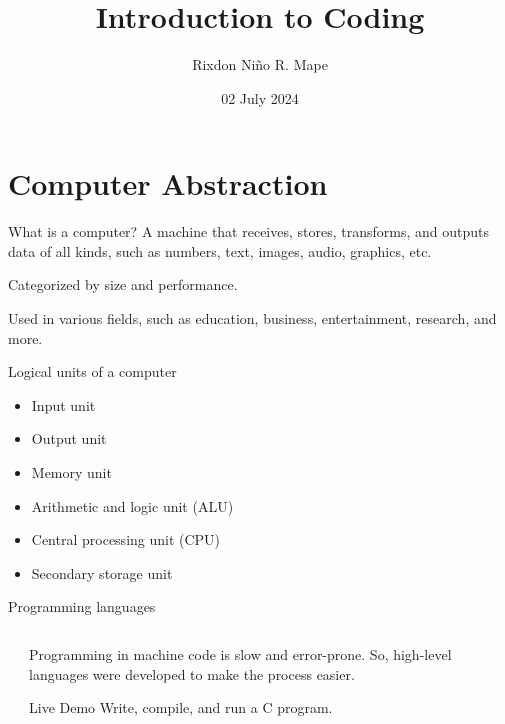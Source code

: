 \documentclass[sectionframe]{oxblue-beamer}
\title{Introduction to Coding}
\author[Mape, R. N. R.]{Rixdon Niño R. Mape}
\institute{
    College of Science \\
    Computer Science and Information Technology Department \\
    Bicol University
}
\date{02 July 2024}
\begin{document}
\begin{frame}
\titlepage
\end{frame}

\section{Computer Abstraction}

\begin{frame}{What is a computer?}
A machine that receives, stores, transforms, and outputs data of all kinds, such as numbers, text, images, audio, graphics, etc.

\bigskip Categorized by size and performance.

\bigskip Used in various fields, such as education, business, entertainment, research, and more.
\end{frame}

\begin{frame}{Logical units of a computer}
\begin{itemize}
    \item Input unit
    \item Output unit
    \item Memory unit
    \item Arithmetic and logic unit (ALU)
    \item Central processing unit (CPU)
    \item Secondary storage unit
\end{itemize}
\end{frame}

\begin{frame}{Programming languages}
\begin{columns}
\begin{column}{0.3\textwidth}
\end{column}
\begin{column}{0.6\textwidth}
    Programming in machine code is slow and error-prone. So, high-level languages were developed to make the process easier.

    \par\bigskip \begin{block}{Live Demo}
        Write, compile, and run a C program.
    \end{block}
\end{column}
\end{columns}
\end{frame}
\end{document}
